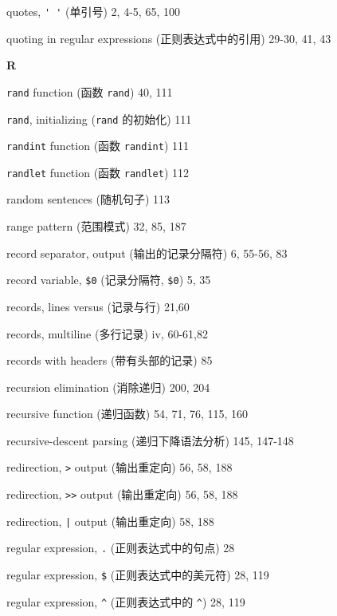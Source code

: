\begin{multicols}{2}
\hangindent=2pc  quotes, \verb"' '" (单引号) 2, 4-5, 65, 100

\hangindent=2pc  quoting in regular expressions
(正则表达式中的引用) 29-30, 41, 43

\medskip\textbf{\large{R}}

\hangindent=2pc  \verb'rand' function (函数 \verb'rand') 40, 111

\hangindent=2pc  \verb'rand', initializing (\verb'rand'
的初始化) 111

\hangindent=2pc  \verb'randint' function (函数 \verb'randint') 111

\hangindent=2pc  \verb'randlet' function (函数 \verb'randlet') 112

\hangindent=2pc  random sentences (随机句子) 113

\hangindent=2pc  range pattern (范围模式) 32, 85, 187

\hangindent=2pc  record separator, output (输出的记录分隔符)
6, 55-56, 83

\hangindent=2pc  record variable, \verb'$0' (记录分隔符,
\verb'$0') 5, 35

\hangindent=2pc  records, lines versus (记录与行) 21,60

\hangindent=2pc  records, multiline (多行记录) iv, 60-61,82

\hangindent=2pc  records with headers (带有头部的记录) 85

\hangindent=2pc  recursion elimination (消除递归) 200, 204

\hangindent=2pc  recursive function (递归函数) 54, 71, 76, 115, 160

\hangindent=2pc  recursive-descent parsing (递归下降语法分析) 145, 147-148

\hangindent=2pc  redirection, \verb'>' output (输出重定向) 56, 58, 188

\hangindent=2pc  redirection, \verb'>>' output (输出重定向) 56, 58, 188

\hangindent=2pc  redirection, \verb'|' output (输出重定向) 58, 188

\hangindent=2pc  regular expression, \verb'.'
(正则表达式中的句点) 28

\hangindent=2pc  regular expression, \verb'$'
(正则表达式中的美元符) 28, 119

\hangindent=2pc  regular expression, \verb'^' (正则表达式中的
\verb'^') 28, 119


\end{multicols}
